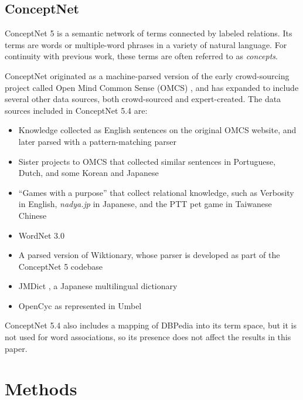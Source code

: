 \documentclass[letterpaper]{article}
\begin{document}
\subsection{ConceptNet}
ConceptNet 5 \cite{speer2012conceptnet} is a semantic network of terms
connected by labeled relations. Its terms are words or multiple-word phrases
in a variety of natural language. For continuity with previous work,
these terms are often referred to as {\em concepts}.

ConceptNet originated as a machine-parsed version of the early crowd-sourcing
project called Open Mind Common Sense (OMCS) \cite{singh2002omcs}, and has expanded
to include several other data sources, both crowd-sourced and expert-created.
The data sources included in ConceptNet 5.4 are:

\begin{itemize}
\item Knowledge collected as English sentences on the original OMCS website,
    and later parsed with a pattern-matching parser
\item Sister projects to OMCS that collected similar sentences in Portuguese,
    Dutch, and some Korean and Japanese \cite{anacleto2006portuguese}
    \cite{eckhardt2008dutch} \cite{TODO-globalmind}
\item ``Games with a purpose'' that collect relational knowledge, such as
    Verbosity \cite{vonahn2006verbosity} in English, {\em nadya.jp}
    \cite{nakahara2011nadya} in Japanese, and the PTT pet game \cite{kuo2009petgame}
    in Taiwanese Chinese
\item WordNet 3.0 \cite{fellbaum1998wordnet}
\item A parsed version of Wiktionary, whose parser is developed as part of the
    ConceptNet 5 codebase
\item JMDict \cite{TODOjmdict}, a Japanese multilingual dictionary
\item OpenCyc \cite{TODOcyc} as represented in Umbel \cite{TODOumbel}
\end{itemize}

ConceptNet 5.4 also includes a mapping of DBPedia \cite{auer2007dbpedia} into
its term space, but it is not used for word associations, so its presence does
not affect the results in this paper.



\section{Methods}
\end{document}
